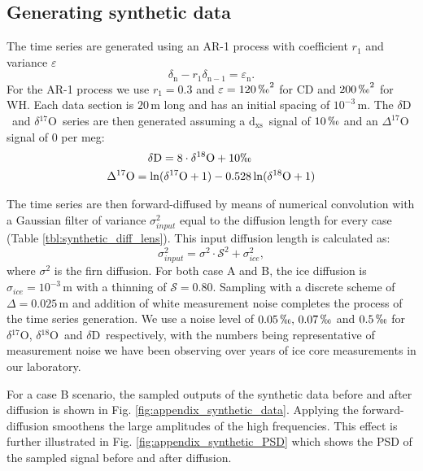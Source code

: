 \documentclass[11pt, draftcls, onecolumn]{IEEEtran} %
\numberwithin{equation}{section}
\numberwithin{table}{section}
\numberwithin{figure}{section}
\newcommand{\delOx}{$\delta{}^{18}\mathrm{O}$}
\newcommand{\delOxb}{$\delta{}^{17}\mathrm{O}$}
\newcommand{\delD}{$\delta\mathrm{D}$}
\newcommand{\Dxs}{$\mathrm{d_{xs}}$}
\begin{document}
\begin{appendices}
\section{Generating synthetic data}	\label{sec:appendix_synthetic}

The time series are generated using an AR-1 process with coefficient $r_1$ and variance $\varepsilon$
\begin{equation}
\delta_{\mathrm{n}} - r_1 \delta_{\mathrm{n-1}} = \varepsilon_{\mathrm{n}}.
\label{eq:appen_ar1}
\end{equation}
For the AR-1 process we use $r_1 = 0.3$ and $\varepsilon = 120\,\permil^2$ for CD and $200\,\permil^2$ for WH.
Each data section is $20\, \mathrm{m}$ long and has an initial spacing of 
$10^{-3}\, \mathrm{m}$. The \delD~and \delOxb~series are then
generated assuming a \Dxs~signal of $10\,\permil$ and an
$\Delta^{17}\mathrm{O}$ signal of 0 per meg:
\begin{align} 
\delta\mathrm{D} = 8 \cdot \delta^{18}\mathrm{O} + 10 \permil&\\
\Delta^{17}\mathrm{O} = \ln(\delta^{17}\mathrm{O}+1) - 0.528&\ln(\delta^{18}\mathrm{O} +1)
\end{align}

The time series are then forward-diffused by means of numerical convolution 
with a Gaussian filter of variance $\sigma^2_{input}$ equal to the diffusion length 
for every case (Table \ref{tbl:synthetic_diff_lens}). 
This input diffusion length is calculated as:
\begin{equation}
\sigma^2_{input} = \sigma^2 \cdot \mathcal{S}^2 + \sigma^2_{ice},
\end{equation}
where $\sigma^2 $ is the firn diffusion. For both case A and B, the ice diffusion is $\sigma_{ice} = 10^{-3}\,\mathrm{m}$ with a thinning of $\mathcal{S} = 0.80$.
Sampling with a discrete scheme of $\Delta = 0.025\, \mathrm{m}$ and 
addition of white measurement noise completes the process
of the time series generation. We use a noise level of $0.05\,\permil, \,0.07\,\permil$ and $0.5\,\permil$ 
for \delOxb, \delOx~and \delD~respectively, with the numbers 
being representative of measurement noise we have been 
observing over years of ice core measurements in our laboratory.

For a case B scenario, the sampled outputs of the synthetic data before and after diffusion is shown in Fig. \ref{fig:appendix_synthetic_data}.
Applying the forward-diffusion smoothens the large amplitudes of the high frequencies. 
This effect is further illustrated in Fig. \ref{fig:appendix_synthetic_PSD} which shows the PSD of the sampled signal before and after diffusion.


\end{appendices}
\end{document}
